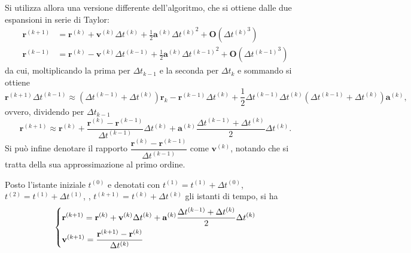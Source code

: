 \documentclass[11pt]{article}
\begin{document}
	Si utilizza allora una versione differente dell'algoritmo, che si ottiene dalle due espansioni in serie di Taylor:
	\begin{align*}
		\mathbf{r}^{(k + 1)} &= \mathbf{r}^{(k)} + \mathbf{v}^{(k)}\Delta t^{(k)} + \frac{1}{2}\mathbf{a}^{(k)}\Delta {t^{(k)}}^2 + \mathbf{O}(\Delta {t^{(k)}}^3) \\
		\mathbf{r}^{(k - 1)} &= \mathbf{r}^{(k)} - \mathbf{v}^{(k)}\Delta t^{(k-1)} + \frac{1}{2}\mathbf{a}^{(k)}\Delta {t^{(k-1)}}^2 + \mathbf{O}(\Delta {t^{(k-1)}}^3) 
	\end{align*}
	da cui, moltiplicando la prima per $\Delta t_{k-1}$ e la seconda per $\Delta t_k$ e sommando si ottiene
	\begin{equation*}
		\mathbf{r}^{(k + 1)}\Delta t^{(k - 1)} \approx (\Delta t^{(k - 1)} + \Delta t^{(k)})\mathbf{r}_k - \mathbf{r}^{(k - 1)}\Delta t^{(k)} + \frac{1}{2}\Delta t^{(k - 1)} \Delta t^{(k)} (\Delta t^{(k - 1)} + \Delta t^{(k)})\mathbf{a}^{(k)},
	\end{equation*}
	ovvero, dividendo per $\Delta t_{k-1}$
	\begin{equation*}
		\mathbf{r}^{(k + 1)} \approx \mathbf{r}^{(k)} + \frac{\mathbf{r}^{(k)} - \mathbf{r}^{(k - 1)}}{\Delta t^{(k - 1)}}\Delta t^{(k)} + \mathbf{a}^{(k)}\frac{\Delta t^{(k - 1)} + \Delta t^{(k)}}{2}\Delta t^{(k)}.
	\end{equation*}
	Si può infine denotare il rapporto $\dfrac{\mathbf{r}^{(k)} - \mathbf{r}^{(k - 1)}}{\Delta t^{(k - 1)}}$ come $\mathbf{v}^{(k)}$, notando che si tratta della sua approssimazione al primo ordine.

	\begin{tcolorbox}[title=Algoritmo di Störmer-Verlet modificato]
		Posto l'istante iniziale $t^{(0)}$ e denotati con $t^{(1)} = t^{(1)} + \Delta t^{(0)}$, $t^{(2)} = t^{(1)} + \Delta t^{(1)}$, \textellipsis, $t^{(k + 1)} = t^{(k)} + \Delta t^{(k)}$ gli istanti di tempo, si ha
		\begin{equation}
			\begin{dcases}
				\mathbf{r}^{(k + 1)} = \mathbf{r}^{(k)} + \mathbf{v}^{(k)}\Delta t^{(k)} + \mathbf{a}^{(k)}\frac{\Delta t^{(k - 1)} + \Delta t^{(k)}}{2}\Delta t^{(k)} \\
				\mathbf{v}^{(k + 1)} = \frac{\mathbf{r}^{(k + 1)} - \mathbf{r}^{(k)}}{\Delta t^{(k)}}
			\end{dcases}
		\end{equation}
	\end{tcolorbox}
\end{document}
